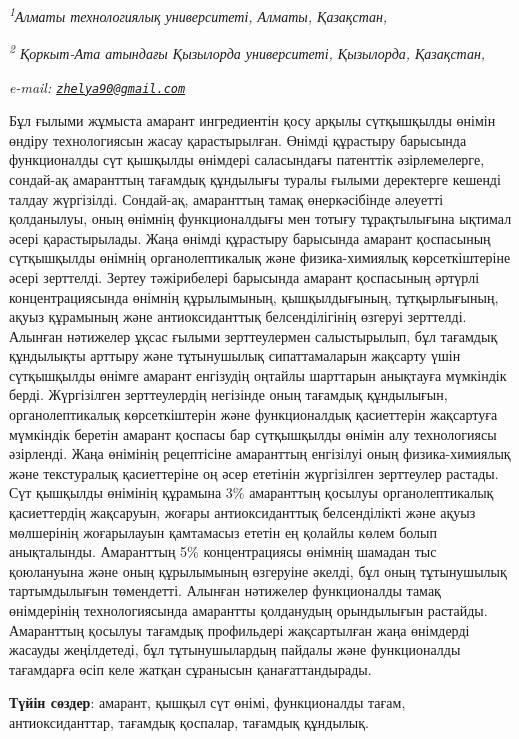 {\emph{\textsuperscript{1}Алматы технологиялық университеті, Алматы,
Қазақстан,}

\emph{\textsuperscript{2} Қоркыт-Ата атындағы Қызылорда университеті,
Қызылорда, Қазақстан,}

\emph{e-mail:
\href{mailto:zhelya90@gmail.com}{\nolinkurl{zhelya90@gmail.com}}}

Бұл ғылыми жұмыста амарант ингредиентін қосу арқылы сүтқышқылды өнімін
өндіру технологиясын жасау қарастырылған. Өнімді құрастыру барысында
функционалды сүт қышқылды өнімдері саласындағы патенттік әзірлемелерге,
сондай-ақ амаранттың тағамдық құндылығы туралы ғылыми деректерге кешенді
талдау жүргізілді. Сондай-ақ, амаранттың тамақ өнеркәсібінде әлеуетті
қолданылуы, оның өнімнің функционалдығы мен тотығу тұрақтылығына ықтимал
әсері қарастырылады. Жаңа өнімді құрастыру барысында амарант қоспасының
сүтқышқылды өнімнің органолептикалық және физика-химиялық
көрсеткіштеріне әсері зерттелді. Зертеу тәжірибелері барысында амарант
қоспасының әртүрлі концентрациясында өнімнің құрылымының, қышқылдығының,
тұтқырлығының, ақуыз құрамының және антиоксиданттық белсенділігінің
өзгеруі зерттелді. Алынған нәтижелер ұқсас ғылыми зерттеулермен
салыстырылып, бұл тағамдық құндылықты арттыру және тұтынушылық
сипаттамаларын жақсарту үшін сүтқышқылды өнімге амарант енгізудің
оңтайлы шарттарын анықтауға мүмкіндік берді. Жүргізілген зерттеулердің
негізінде оның тағамдық құндылығын, органолептикалық көрсеткіштерін және
функционалдық қасиеттерін жақсартуға мүмкіндік беретін амарант қоспасы
бар сүтқышқылды өнімін алу технологиясы әзірленді. Жаңа өнімінің
рецептісіне амаранттың енгізілуі оның физика-химиялық және текстуралық
қасиеттеріне оң әсер ететінін жүргізілген зерттеулер растады. Сүт
қышқылды өнімінің құрамына 3\% амаранттың қосылуы органолептикалық
қасиеттердің жақсаруын, жоғары антиоксиданттық белсенділікті және ақуыз
мөлшерінің жоғарылауын қамтамасыз ететін ең қолайлы көлем болып
анықталынды. Амаранттың 5\% концентрациясы өнімнің шамадан тыс
қоюлануына және оның құрылымының өзгеруіне әкелді, бұл оның тұтынушылық
тартымдылығын төмендетті. Алынған нәтижелер функционалды тамақ
өнімдерінің технологиясында амарантты қолданудың орындылығын растайды.
Амаранттың қосылуы тағамдық профильдері жақсартылған жаңа өнімдерді
жасауды жеңілдетеді, бұл тұтынушылардың пайдалы және функционалды
тағамдарға өсіп келе жатқан сұранысын қанағаттандырады.

{\bfseries Түйін сөздер}: амарант, қышқыл сүт өнімі, функционалды тағам,
антиоксиданттар, тағамдық қоспалар, тағамдық құндылық.

}
